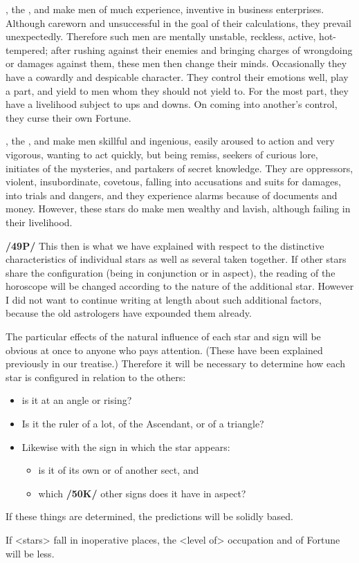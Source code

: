 \Mars, the \Sun, and \Mercury\xspace make men of much experience, inventive in business enterprises. Although careworn and unsuccessful in the goal of their calculations, they prevail unexpectedly. Therefore such men are mentally unstable, reckless, active, hot-tempered; after rushing against their enemies and bringing charges of wrongdoing or damages against them, these men then change their minds.
Occasionally they have a cowardly and despicable character. They control their emotions well, play a part, and yield to men whom they should not yield to. For the most part, they have a livelihood subject to ups and downs. On coming into another’s control, they curse their own Fortune.

\Mars, the \Moon, and \Mercury\xspace make men skillful and ingenious, easily aroused to action and very vigorous, wanting to act quickly, but being remiss, seekers of curious lore, initiates of the mysteries, and partakers of secret knowledge. They are oppressors, violent, insubordinate, covetous, falling into accusations and suits for damages, into trials and dangers, and they experience alarms because of documents
and money. However, these stars do make men wealthy and lavish, although failing in their livelihood. 

\textbf{/49P/} This then is what we have explained with respect to the distinctive characteristics of individual stars as well as several taken together. If other stars share the configuration (being in conjunction or in aspect), the reading of the horoscope will be changed according to the nature of the additional star. However I did not want to continue writing at length about such additional factors, because the old astrologers have expounded them already. 

\mndl[0.2cm]
The particular effects of the natural influence of each star and sign will be obvious at once to anyone who pays attention. (These have been explained previously in our treatise.) Therefore it will be necessary to determine how each star is configured in relation to the others: 
\begin{itemize}
\item is it at an angle or rising? 
\item Is it the ruler of a lot, of the Ascendant, or of a triangle? 
\item Likewise with the sign in which the star appears: 
\begin{itemize}
\item is it of its own or of another sect, and 
\item which \textbf{/50K/} other signs does it have in aspect? 
\end{itemize}
\end{itemize}

If these things are determined, the predictions will be solidly based. 

If <stars> fall in inoperative places, the <level of> occupation and of Fortune will be less.


\newpage